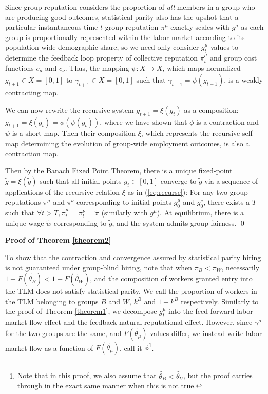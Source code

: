 \documentclass[sigconf]{acmart}
\theoremstyle{definition}
\begin{document}
Since group reputation considers the proportion of \emph{all} members in a group who are producing good outcomes,  statistical parity also has the upshot that a particular instantaneous time $t$ group reputation $\pi^\mu$ exactly scales with $g^\mu$ as each group is proportionally represented within the labor market according to its population-wide demographic share, so we need only consider $g^\mu_t$ values to determine the feedback loop property of collective reputation $\pi^\mu_t$ and group cost functions $c_\mu$ and $c_\nu$. Thus, the mapping $\psi: X \rightarrow X$, which maps normalized $g_{t+1} \in X = [0,1]$ to $\gamma_{t+1} \in X = [0,1]$ such that $\gamma_{t+1} = \psi(g_{t+1})$, is a weakly contracting map. 

We can now rewrite the recursive system $g_{t+1} = \xi(g_t)$ as a composition: $g_{t+1} = \xi(g_t) = \phi(\psi(g_t))$, where we have shown that $\phi$ is a contraction and $\psi$ is a short map. Then their composition $\xi$, which represents the recursive self-map determining the evolution of group-wide employment outcomes, is also a contraction map.

Then by the Banach Fixed Point Theorem, there is a unique fixed-point $\tilde{g} = \xi(\tilde{g})$ such that all initial points $g_i \in [0,1]$ converge to $\tilde{g}$ via a sequence of applications of the recursive relation $\xi$ as in (\ref{eq:recurse}): For any two group reputations $\pi^\mu$ and $\pi^\nu$ corresponding to initial points $g^\mu_0$ and $g^\nu_0$, there exists a $T$ such that $\forall t > T, \pi^\mu_t = \pi^\nu_t = \tilde{\pi}$ (similarly with $g^\mu$). At equilibrium, there is a unique wage $\tilde{w}$ corresponding to $\tilde{g}$, and the system admits group fairness. \qed
\vspace{5pt}

\noindent \textbf{Proof of Theorem \ref{theorem2}}

To show that the contraction and convergence assured by statistical parity hiring is not guaranteed under group-blind hiring, note that when $\pi_B < \pi_W$, necessarily $1-F(\widetilde{\theta_B}) < 1-F(\widetilde{\theta_W})$, and the composition of workers granted entry into the TLM does not satisfy statistical parity. We call the proportion of workers in the TLM belonging to groups $B$ and $W$, $k^B$ and $1-k^B$ respectively. Similarly to the proof of Theorem \ref{theorem1}, we decompose $g^\mu_t$ into the feed-forward labor market flow effect and the feedback natural reputational effect. However, since $\gamma^\mu$ for the two groups are the same, and $F(\widetilde{\theta_\mu})$ values differ, we instead write labor market flow as a function of $F(\widetilde{\theta_\mu})$, call it $\phi$\footnote{Note that in this proof, we also assume that $\widetilde{\theta_B} < \widetilde{\theta_U}$, but the proof carries through in the exact same manner when this is not true.}.
\end{document}

